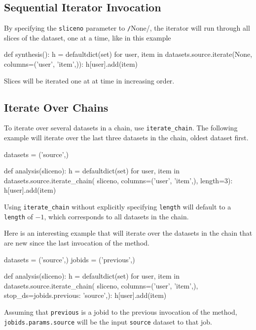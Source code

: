 \subsection*{Sequential Iterator Invocation}
By specifying the \texttt{sliceno} parameter to
\texttt/None/, the iterator will run through all slices of
the dataset, one at a time, like in this example
\begin{python}
def synthesis():
    h = defaultdict(set)
    for user, item in datasets.source.iterate(None,
                                              columns=('user', 'item',)):
        h[user].add(item)
\end{python}
Slices will be iterated one at at time in increasing order.



\subsection*{Iterate Over Chains}
To iterate over several datasets in a chain, use
\texttt{iterate\_chain}.  The following example will iterate over the
last three datasets in the chain, oldest dataset first.
\begin{python}
datasets = ('source',)

def analysis(sliceno):
    h = defaultdict(set)
    for user, item in datasets.source.iterate_chain(
                      sliceno, columns=('user', 'item',), length=3):
        h[user].add(item)
\end{python}
Using \texttt{iterate\_chain} without explicitly specifying
\texttt{length} will default to a \texttt{length} of $-1$, which
corresponds to all datasets in the chain.

Here is an interesting example that will iterate over the datasets in
the chain that are new since the last invocation of the method.
\begin{python}
datasets = ('source',)
jobids = ('previous',)

def analysis(sliceno):
    h = defaultdict(set)
    for user, item in datasets.source.iterate_chain(
            sliceno,
            columns=('user', 'item',),
            stop_ds={jobids.previous: 'source',}):
        h[user].add(item)
\end{python}
Assuming that \texttt{previous} is a jobid to the previous invocation
of the method, \texttt{jobids.params.source} will be the
input \texttt{source} dataset to that job.



